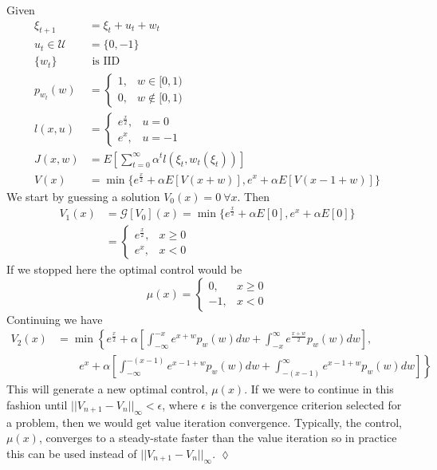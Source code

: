 \begin{example}
Given
\begin{align*}
\xi_{t+1} &= \xi_t+u_t+w_t \\
u_t\in\mathcal{U} &= \{0,-1\} \\
\{w_t\} &\text{ is IID} \\
p_{w_t}(w) &= \begin{cases} 1, & w\in[0,1) \\ 0, & w\notin[0,1) \end{cases} \\
l(x,u) &= \begin{cases} e^{\frac{x}{2}}, & u=0 \\ e^x, & u=-1 \end{cases} \\
J(x,w) &= E\left[\sum_{t=0}^\infty \alpha^tl(\xi_t,w_t(\xi_t))\right] \\
V(x) &= \min\{e^{\frac{x}{2}} + \alpha E[V(x+w)], e^x + \alpha E[V(x-1+w)]\}
\end{align*}
We start by guessing a solution $V_0(x)=0 ~\forall x$. Then
\begin{align*}
V_1(x) &= \mathcal{G}[V_0](x) = \min\{e^{\frac{x}{2}}+\alpha E[0], e^x + \alpha E[0]\} \\
&= \begin{cases} e^{\frac{x}{2}}, & x\geq0 \\ e^x, & x<0 \end{cases}
\end{align*}
If we stopped here the optimal control would be
$$\mu(x) = \begin{cases} 0, & x\geq0 \\ -1, & x<0 \end{cases}$$
Continuing we have
\begin{align*}
V_2(x) &= \min\left\lbrace e^{\frac{x}{2}} + \alpha\left[\int_{-\infty}^{-x} e^{x+w}p_w(w)dw + \int_{-x}^\infty e^{\frac{x+w}{2}}p_w(w)dw\right], \right. \\
&\left.\qquad e^x+\alpha\left[\int_{-\infty}^{-(x-1)}e^{x-1+w}p_w(w)dw + \int_{-(x-1)}^\infty e^{x-1+w}p_w(w)dw\right]\right\rbrace
\end{align*}
This will generate a new optimal control, $\mu(x)$. If we were to continue in this fashion until $||V_{n+1}-V_n||_\infty<\epsilon$, where $\epsilon$ is the convergence criterion selected for a problem, then we would get value iteration convergence. Typically, the control, $\mu(x)$, converges to a steady-state faster than the value iteration so in practice this can be used instead of $||V_{n+1}-V_n||_\infty$.
$\lozenge$
\end{example}

